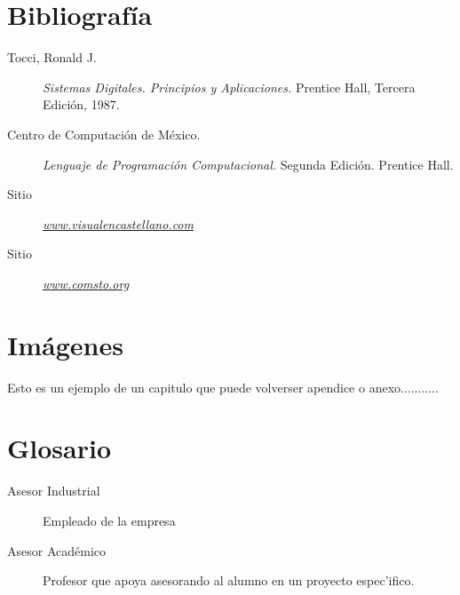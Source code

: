 \documentclass[12pt,spanish]{report}
\begin{document}
\newpage

\appendix
\chapter{Bibliograf\'ia}

\begin{description}
\item[Tocci, Ronald J.]{\emph{Sistemas Digitales. Principios y Aplicaciones.}} Prentice Hall, Tercera Edici\'on, 1987.
\item[Centro de Computaci\'on de M\'exico.] {\emph{Lenguaje de Programaci\'on Computacional.}} Segunda Edici\'on. Prentice Hall.
\item[Sitio] \underline{\emph{www.visualencastellano.com}}
\item[Sitio] \underline{\emph{www.comsto.org}}
\end{description}

\newpage

\chapter{Im\'agenes}

Esto es un ejemplo de un capitulo que puede volverser apendice o anexo...........

\newpage

\chapter{Glosario}

\begin{description}
\item[Asesor Industrial] Empleado de la empresa
\item[Asesor Acad\'emico] Profesor que apoya asesorando al alumno en un proyecto espec'ifico.
\end{description}

\newpage


\end{document}
